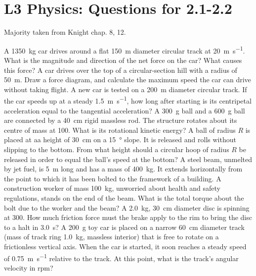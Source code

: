 \documentclass[a4paper]{exam}
\begin{document}
  \section*{L3 Physics: Questions for 2.1-2.2}
  Majority taken from Knight chap. 8, 12.
  \begin{questions}
    \question A \SI{1350}{\kilo\gram} car drives around a flat \SI{150}{\metre} diameter circular track at \SI{20}{\metre\per\second}.
              What is the magnitude and direction of the net force on the car? What causes this force?
    \question A car drives over the top of a circular-section hill with a radius of \SI{50}{\metre}. Draw a force diagram, and calculate
              the maximum speed the car can drive without taking flight.
    \question A new car is tested on a \SI{200}{\metre} diameter circular track. If the car speeds up at a steady \SI{1.5}{\metre\per\second},
              how long after starting is its centripetal acceleration equal to the tangential acceleration?
    \question A \SI{300}{\gram} ball and a \SI{600}{\gram} ball are connected by a \SI{40}{\centi\metre} rigid massless rod. The structure rotates
              about its centre of mass at \SI{100}{\rpm}. What is its rotational kinetic energy?
    \question A ball of radius $ R $ is placed at aa height of \SI{30}{\centi\metre} on a \SI{15}{\degree} slope. It is released and rolls
              without slipping to the bottom. From what height should a circular hoop of radius $ R $ be released in order to equal the
              ball's speed at the bottom?
    \question A steel beam, unmelted by jet fuel, is \SI{5}{\metre} long and has a mass of \SI{400}{\kilo\gram}. It extends horizontally
              from the point to which it has been bolted to the framework of a building. A construction worker of mass \SI{100}{\kg}, unworried
              about health and safety regulations, stands on the end of the beam. What is the total torque about the bolt due to the worker
              and the beam?
    \question A \SI{2.0}{\kilo\gram}, \SI{30}{\centi\metre} diameter disc is spinning at \SI{300}{\rpm}. How much friction force must the brake
              apply to the rim to bring the disc to a halt in \SI{3.0}{\second}?
    \question A \SI{200}{\gram} toy car is placed on a narrow \SI{60}{\centi\metre} diameter track (mass of track ring \SI{1.0}{\kilo\gram},
              massless interior) that is free to rotate on a frictionless vertical axis. When the car is started, it soon reaches a steady
              speed of \SI{0.75}{\metre\per\second} relative to the track. At this point, what is the track's angular velocity in rpm?

\end{questions}
\end{document}
